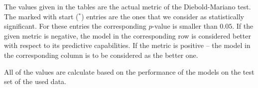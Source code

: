 \documentclass[12pt,a4paper,twoside]{scrartcl}
\numberwithin{equation}{section}
\newcounter{mypagecount}%
\newenvironment{interlude}{%
  \clearpage
  \setcounter{mypagecount}{\value{page}}%
  \thispagestyle{empty}%
  \pagestyle{empty}%
}{%
  \clearpage
  \setcounter{page}{\value{mypagecount}}%
}
\begin{document}
\begin{interlude}
\begin{appendices}
    The values given in the tables are the actual metric of the Diebold-Mariano test. The marked with start (\(^* \)) entries are the ones that we consider as statistically significant. For these entries the corresponding \(p\)-value is smaller than \(0.05\). If the given metric is negative, the model in the corresponding row is considered better with respect to its predictive capabilities. If the metric is positive -- the model in the corresponding column is to be considered as the better one.

    All of the values are calculate based on the performance of the models on the test set of the used data.
    \begin{table}
      \centering
      \label{tab:pred-1d}
    \end{table}
    \begin{table}
      \centering
      \label{tab:pred-12h}
    \end{table}
    \begin{table}
      \centering
      \label{tab:pred-1h}
    \end{table}

    \clearpage

\end{appendices}
\end{interlude}
\end{document}
